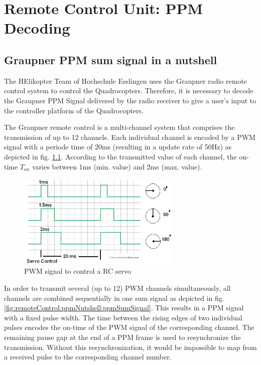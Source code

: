\chapter{Remote Control Unit: PPM Decoding}
\label{sec:remoteControl}

\section{Graupner PPM sum signal in a nutshell}
\label{sec:remoteControl:ppmNutshell}

The HElikopter Team of Hochschule Esslingen uses the Graupner radio remote control system to control the Quadrocopters. Therefore, it is necessary to decode the Graupner PPM Signal delivered by the radio receiver to give a user's input to the controller platform of the Quadrocopters.

The Graupner remote control is a multi-channel system that comprises the transmission of up to 12 channels. Each individual channel is encoded by a PWM signal with a periode time of 20ms (resulting in a update rate of 50Hz) as depicted in fig. \ref{fig:remoteControl:ppmNutshell:pwmSignal}. According to the transmitted value of each channel, the on-time $T_{on}$ varies between 1ms (min. value) and 2ms (max. value).

\begin{figure}[H]
    \centering
    \includegraphics[width=0.7\textwidth]{fig/ch-ppm-kernel-driver/graupnerPWM}
    \caption[PWM signal scheme of a RC servo \cite{doc:RPL}]{PWM signal to control a RC servo \cite{doc:RPL}}
    \label{fig:remoteControl:ppmNutshell:pwmSignal}
\end{figure}


In order to transmit several (up to 12) PWM channels simultaneously, all channels are combined sequentially in one sum signal as depicted in fig. \ref{fig:remoteControl:ppmNutshell:ppmSumSignal}. This results in a PPM signal with a fixed pulse width. The time between the rising edges of two individual pulses encodes the on-time of the PWM signal of the corresponding channel. The remaining pause gap at the end of a PPM frame is used to resynchronize the transmission. Without this resynchronization, it would be impossible to map from a received pulse to the corresponding channel number. 

